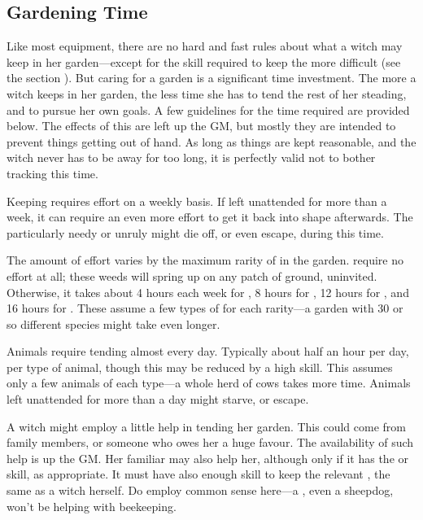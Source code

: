 \subsection{Gardening Time}

Like most equipment, there are no hard and fast rules about what a witch may keep in her garden---except for the  skill required to keep the more difficult  (see the section ).
But caring for a garden is a significant time investment.
The more a witch keeps in her garden, the less time she has to tend the rest of her steading, and to pursue her own goals.
A few guidelines for the time required are provided below.
The effects of this are left up the GM, but mostly they are intended to prevent things getting out of hand.
As long as things are kept reasonable, and the witch never has to be away for too long, it is perfectly valid not to bother tracking this time.

Keeping  requires effort on a weekly basis.
If left unattended for more than a week, it can require an even more effort to get it back into shape afterwards.
The particularly needy or unruly  might die off, or even escape, during this time.

The amount of effort varies by the maximum rarity of  in the garden.
 require no effort at all; these weeds will spring up on any patch of ground, uninvited.
Otherwise, it takes about 4 hours each week for , 8 hours for , 12 hours for , and 16 hours for .
These assume a few types of  for each rarity---a garden with 30 or so different species might take even longer.

Animals require tending almost every day.
Typically about half an hour per day, per type of animal, though this may be reduced by a high  skill.
This assumes only a few animals of each type---a whole herd of cows takes more time.
Animals left unattended for more than a day might starve, or escape.

A witch might employ a little help in tending her garden.
This could come from family members, or someone who owes her a huge favour.
The availability of such help is up the GM.
Her familiar may also help her, although only if it has the  or  skill, as appropriate.
It must have also enough  skill to keep the relevant , the same as a witch herself.
Do employ common sense here---a , even a sheepdog, won't be helping with beekeeping.



